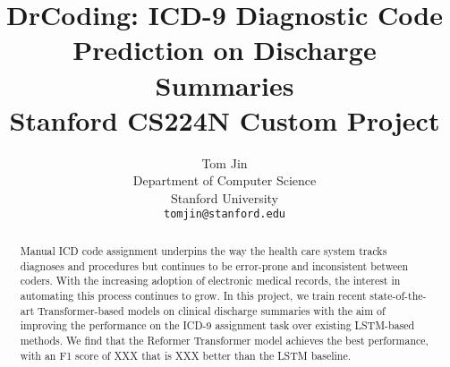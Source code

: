 \documentclass{article}
\title{
  DrCoding: ICD-9 Diagnostic Code Prediction on Discharge Summaries \\
  \vspace{1em}
  \small{\normalfont Stanford CS224N Custom Project}  %
}
\author{
  Tom Jin \\
  Department of Computer Science \\
  Stanford University \\
  \texttt{tomjin@stanford.edu} \\
}
\begin{document}
\maketitle

\begin{abstract}
	Manual ICD code assignment underpins the way the health care system tracks diagnoses and procedures but continues to be error-prone and inconsistent between coders. With the increasing adoption of electronic medical records, the interest in automating this process continues to grow. In this project, we train recent state-of-the-art Transformer-based models on clinical discharge summaries with the aim of improving the performance on the ICD-9 assignment task over existing LSTM-based methods. We find that the Reformer Transformer model achieves the best performance, with an F1 score of XXX that is XXX better than the LSTM baseline.
\end{abstract}
\end{document}
